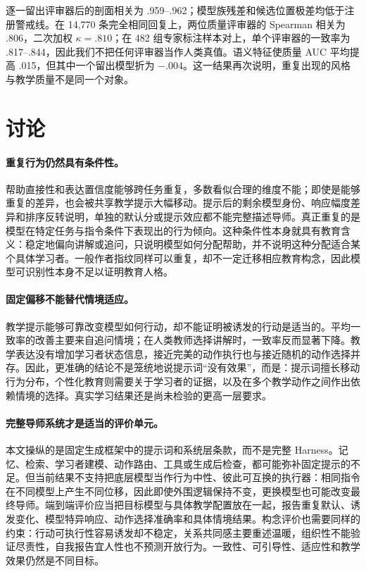 \documentclass[11pt,a4paper,UTF8]{ctexart}
\begin{document}
逐一留出评审器后的剖面相关为 .959--.962；模型族残差和候选位置极差均低于注册警戒线。在 14,770 条完全相同回复上，两位质量评审器的 Spearman 相关为 .806，二次加权 $\kappa=.810$；在 482 组专家标注样本对上，单个评审器的一致率为 .817--.844，因此我们不把任何评审器当作人类真值。语义特征使质量 AUC 平均提高 .015，但其中一个留出模型折为 $-.004$。这一结果再次说明，重复出现的风格与教学质量不是同一个对象。

\section{讨论}

\paragraph{重复行为仍然具有条件性。}
帮助直接性和表达置信度能够跨任务重复，多数看似合理的维度不能；即使是能够重复的差异，也会被共享教学提示大幅移动。提示后的剩余模型身份、响应幅度差异和排序反转说明，单独的默认分或提示效应都不能完整描述导师。真正重复的是模型在特定任务与指令条件下表现出的行为倾向。这种条件性本身就具有教育含义：稳定地偏向讲解或追问，只说明模型如何分配帮助，并不说明这种分配适合某个具体学习者。一般作者指纹同样可以重复，却不一定迁移相应教育构念，因此模型可识别性本身不足以证明教育人格。

\paragraph{固定偏移不能替代情境适应。}
教学提示能够可靠改变模型如何行动，却不能证明被诱发的行动是适当的。平均一致率的改善主要来自追问情境；在人类教师选择讲解时，一致率反而显著下降。教学表达没有增加学习者状态信息，接近完美的动作执行也与接近随机的动作选择并存。因此，更准确的结论不是笼统地说提示词“没有效果”，而是：提示词擅长移动行为分布，个性化教育则需要关于学习者的证据，以及在多个教学动作之间作出依赖情境的选择。真实学习结果还是尚未检验的更高一层要求。

\paragraph{完整导师系统才是适当的评价单元。}
本文操纵的是固定生成框架中的提示词和系统层条款，而不是完整 Harness。记忆、检索、学习者建模、动作路由、工具或生成后检查，都可能弥补固定提示的不足。但当前结果不支持把底层模型当作行为中性、彼此可互换的执行器：相同指令在不同模型上产生不同位移，因此即使外围逻辑保持不变，更换模型也可能改变最终导师。端到端评价应当把目标模型与具体教学配置放在一起，报告重复默认、诱发变化、模型特异响应、动作选择准确率和具体情境结果。构念评价也需要同样的约束：行动可执行性容易诱发却不稳定，关系共同感主要重述温暖，组织性不能验证尽责性，自我报告宜人性也不预测开放行为。一致性、可引导性、适应性和教学效果仍然是不同目标。
\end{document}
